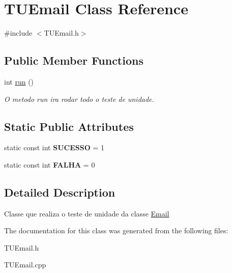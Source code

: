 \hypertarget{classTUEmail}{}\section{T\+U\+Email Class Reference}
\label{classTUEmail}


{\ttfamily \#include $<$T\+U\+Email.\+h$>$}

\subsection*{Public Member Functions}
\begin{DoxyCompactItemize}
\item 
int \hyperlink{classTUEmail_a8d43b68b8b80ada3b28d72d35df9a34f}{run} ()\hypertarget{classTUEmail_a8d43b68b8b80ada3b28d72d35df9a34f}{}\label{classTUEmail_a8d43b68b8b80ada3b28d72d35df9a34f}

\begin{DoxyCompactList}\small\item\em O metodo run ira rodar todo o teste de unidade. \end{DoxyCompactList}\end{DoxyCompactItemize}
\subsection*{Static Public Attributes}
\begin{DoxyCompactItemize}
\item 
static const int {\bfseries S\+U\+C\+E\+S\+SO} = 1\hypertarget{classTUEmail_a8b39fe0050c65de0c2968f4c4e164dbc}{}\label{classTUEmail_a8b39fe0050c65de0c2968f4c4e164dbc}

\item 
static const int {\bfseries F\+A\+L\+HA} = 0\hypertarget{classTUEmail_af85d3036fdfc515f28636f9e5e60a98d}{}\label{classTUEmail_af85d3036fdfc515f28636f9e5e60a98d}

\end{DoxyCompactItemize}


\subsection{Detailed Description}
Classe que realiza o teste de unidade da classe \hyperlink{classEmail}{Email} 

The documentation for this class was generated from the following files\+:\begin{DoxyCompactItemize}
\item 
T\+U\+Email.\+h\item 
T\+U\+Email.\+cpp\end{DoxyCompactItemize}
